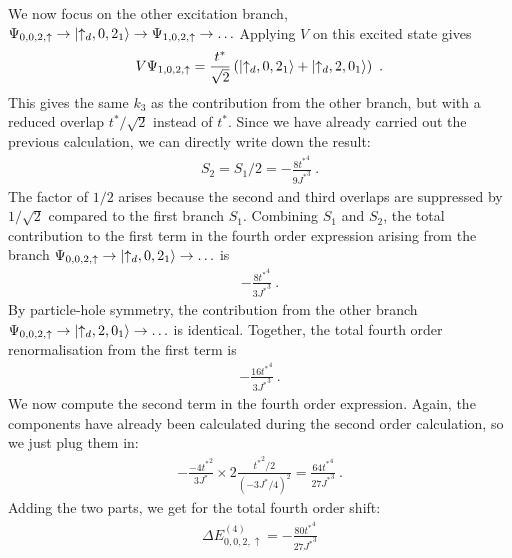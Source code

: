 We now focus on the other excitation branch, \(\Psi_{0,0,2,\uparrow} \to \ket{\uparrow_d,0,2_1} \to \Psi_{1,0,2,\uparrow} \to \ldots\) Applying \(V\) on this excited state gives
\begin{equation}\begin{aligned}
	V\Psi_{1,0,2,\uparrow} = \frac{t^*}{\sqrt 2}\left(\ket{\uparrow_d,0,2_1} + \ket{\uparrow_d,2,0_1}\right)~.
\end{aligned}\end{equation}
This gives the same \(k_3\) as the contribution from the other branch, but with a reduced overlap \(t^*/\sqrt 2\) instead of \(t^*\). Since we have already carried out the previous calculation, we can directly write down the result:
\begin{equation}\begin{aligned}
S_2 = S_1/2 = -\frac{8{t^*}^4}{9{J^*}^3}~.
\end{aligned}\end{equation}
The factor of \(1/2\) arises because the second and third overlaps are suppressed by \(1/\sqrt 2\) compared to the first branch \(S_1\). Combining \(S_1\) and \(S_2\), the total contribution to the first term in the fourth order expression arising from the branch \(\Psi_{0,0,2,\uparrow} \to \ket{\uparrow_d,0,2_1} \to \ldots\) is
\begin{equation}\begin{aligned}
-\frac{8{t^*}^4}{3{J^*}^3}~.
\end{aligned}\end{equation}
By particle-hole symmetry, the contribution from the other branch \(\Psi_{0,0,2,\uparrow} \to \ket{\uparrow_d,2,0_1} \to \ldots\) is identical. Together, the total fourth order renormalisation from the first term is
\begin{equation}\begin{aligned}
-\frac{16{t^*}^4}{3{J^*}^3}~.
\end{aligned}\end{equation}
We now compute the second term in the fourth order expression. Again, the components have already been calculated during the second order calculation, so we just plug them in:
\begin{equation}\begin{aligned}
	- \frac{-4{t^*}^2}{3J^*} \times 2\frac{{t^*}^2/2}{(-3J^*/4)^2} = \frac{64{t^*}^4}{27{J^*}^3}~.
\end{aligned}\end{equation}
Adding the two parts, we get for the total fourth order shift:
\begin{equation}\begin{aligned}
\Delta E^{(4)}_{0,0,2,\uparrow} = -\frac{80{t^*}^4}{27{J^*}^3}
\end{aligned}\end{equation}

